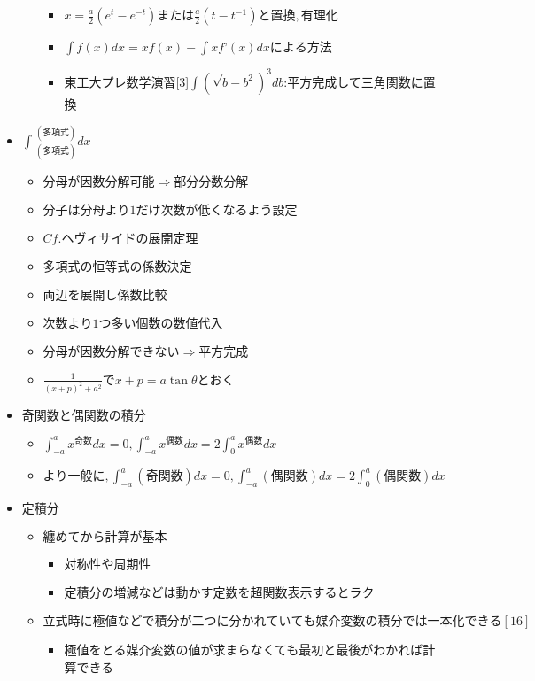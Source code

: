 \documentclass[dvipdfmx,uplatex]{jsarticle}
\begin{document}
\begin{itemize}
\begin{itemize}
		\begin{itemize}
			\item $  x = \frac{a}{2}(e^t - e^{-t}) または \frac{a}{2}(t - t^{-1}) と置換,有理化$
			\item $ \int f(x)dx = xf(x) - \int xf’(x)dx による方法$
			\item 東工大プレ数学演習[3]$\int (\sqrt{b-b^2})^3db$:平方完成して三角関数に置換
		\end{itemize}
	\end{itemize}
	\item $ \int \frac{(多項式)}{(多項式)}dx$
	\begin{itemize}
		\item $ 分母が因数分解可能⇒部分分数分解$
		\item $  分子は分母より1だけ次数が低くなるよう設定$
		\item $ Cf. ヘヴィサイドの展開定理$
		\item $ 多項式の恒等式の係数決定$
		\item $ 両辺を展開し係数比較$
		\item $ 次数より1つ多い個数の数値代入$
		\item $ 分母が因数分解できない⇒平方完成$
		\item $ \frac{1}{(x + p)^2 + a^2} で x + p = a \tan \theta とおく$
	\end{itemize}
	\item $ 奇関数と偶関数の積分$
	\begin{itemize}
		\item $ \int^a_{-a} x^{奇数}dx = 0, \int^a_{-a} x^{偶数}dx = 2\int^a_0 x^{偶数}dx$
		\item $ より一般に, \int^a_{-a} (奇関数)dx = 0, \int^a_{-a} (偶関数)dx = 2\int^a_{0} (偶関数)dx$
	\end{itemize}
	\item $ 定積分$
	\begin{itemize}
		\item $ 纏めてから計算が基本$
		\begin{itemize}
			\item $ 対称性や周期性$
			\item $ 定積分の増減などは動かす定数を超関数表示するとラク$
		\end{itemize}
		\item $立式時に極値などで積分が二つに分かれていても媒介変数の積分では一本化できる[16]$
		\begin{itemize}
			\item 極値をとる媒介変数の値が求まらなくても最初と最後がわかれば計算できる

\end{itemize}
\end{itemize}
\end{itemize}
\end{document}
